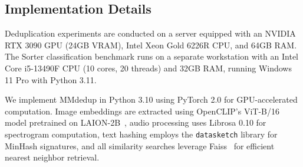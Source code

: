 \documentclass[conference]{IEEEtran}
\begin{document}

\subsection{Implementation Details}

Deduplication experiments are conducted on a server equipped with an NVIDIA RTX 3090 GPU (24GB VRAM), Intel Xeon Gold 6226R CPU, and 64GB RAM. The Sorter classification benchmark runs on a separate workstation with an Intel Core i5-13490F CPU (10 cores, 20 threads) and 32GB RAM, running Windows 11 Pro with Python 3.11.

We implement MMdedup in Python 3.10 using PyTorch 2.0 for GPU-accelerated computation. Image embeddings are extracted using OpenCLIP's ViT-B/16 model pretrained on LAION-2B~\cite{schuhmann2022laion}, audio processing uses Librosa 0.10 for spectrogram computation, text hashing employs the \texttt{datasketch} library for MinHash signatures, and all similarity searches leverage Faiss~\cite{johnson2019billion} for efficient nearest neighbor retrieval.
\end{document}
